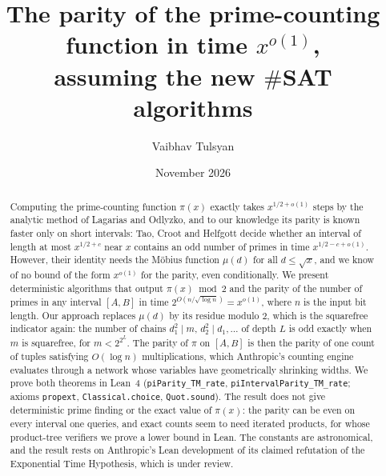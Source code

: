\documentclass[10pt]{amsart}
\theoremstyle{plain}
\theoremstyle{definition}
\theoremstyle{remark}
\numberwithin{equation}{section}
\begin{document}
\title[The parity of $\pi(x)$ in time $x^{o(1)}$]{The parity of the prime-counting function in time $x^{o(1)}$,\\ assuming the new $\#$SAT algorithms}

\author{Vaibhav Tulsyan}

\date{November 2026}


\begin{abstract}
Computing the prime-counting function $\pi(x)$ exactly takes $x^{1/2+o(1)}$ steps by the analytic
method of Lagarias and Odlyzko, and to our knowledge its parity is known faster only on short intervals: Tao,
Croot and Helfgott decide whether an interval of length at most $x^{1/2+c}$ near $x$ contains an odd
number of primes in time $x^{1/2-c+o(1)}$. However, their identity needs the M\"obius function
$\mu(d)$ for all $d\le\sqrt x$, and we know of no bound of the form $x^{o(1)}$ for the parity, even
conditionally. We present deterministic algorithms that output
$\pi(x)\bmod2$ and the parity of the number of primes in any interval $[A,B]$ in time
$2^{O(n/\sqrt{\log n})}=x^{o(1)}$, where $n$ is the input bit length. Our approach replaces $\mu(d)$ by
its residue modulo $2$, which is the squarefree indicator again: the number of chains
$d_1^2\mid m$, $d_2^2\mid d_1,\dots$ of depth $L$ is odd exactly when $m$ is squarefree, for
$m<2^{2^L}$. The parity of $\pi$ on $[A,B]$ is then the parity of one count of tuples satisfying
$O(\log n)$ multiplications, which Anthropic's counting engine evaluates through a network whose
variables have geometrically shrinking widths. We prove both theorems in Lean~4
(\texttt{piParity\_TM\_rate}, \texttt{piIntervalParity\_TM\_rate}; axioms \texttt{propext},
\texttt{Classical.choice}, \texttt{Quot.sound}). The result does not give deterministic prime finding
or the exact value of $\pi(x)$: the parity can be even on every interval one queries, and exact counts
seem to need iterated products, for whose product-tree verifiers we prove a lower bound in Lean. The
constants are astronomical, and the result rests on Anthropic's Lean development of its claimed
refutation of the Exponential Time Hypothesis, which is under review.
\end{abstract}

\maketitle
\end{document}
